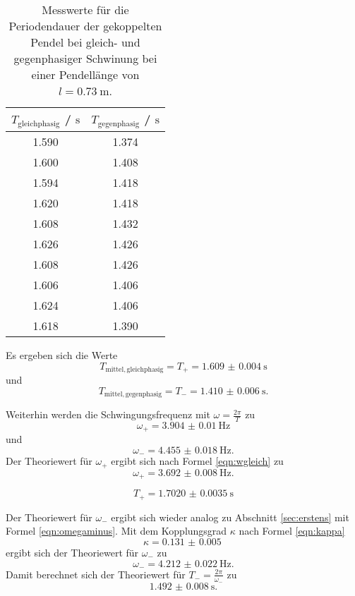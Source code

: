 
\begin{table}
	\centering
	\caption{Messwerte für die Periodendauer der gekoppelten Pendel bei gleich- und
	gegenphasiger Schwinung bei einer Pendellänge von $l=\SI{0.73}{\meter}$.}
	\label{tab:beckham}
	\begin{tabular}{cc}
		\toprule
		$T_{\mathrm{gleichphasig}}$ / $\si{\second}$ & $T_{\mathrm{gegenphasig}}$ 
		/ $\si{\second}$ \\
		\midrule
		1.590 & 1.374 \\
		1.600 & 1.408 \\
		1.594 & 1.418 \\
		1.620 & 1.418 \\
		1.608 & 1.432 \\
		1.626 & 1.426 \\
		1.608 & 1.426 \\
		1.606 & 1.406 \\
		1.624 & 1.406 \\
		1.618 & 1.390 \\
		\bottomrule
	\end{tabular}
\end{table}

Es ergeben sich die Werte 
\begin{equation*}
	T_{\mathrm{mittel,gleichphasig}} = T_+ = \SI{1.609(4)}{\second}
\end{equation*}
und
\begin{equation*}
	T_{\mathrm{mittel,gegenphasig}} = T_- = \SI{1.410(6)}{\second} \mathrm{.}
\end{equation*}

Weiterhin werden die Schwingungsfrequenz mit $\omega = \frac{2\pi}{T}$ zu
\begin{equation*}
	\omega_+ = \SI{3.904(10)}{\hertz}
\end{equation*}
und
\begin{equation*}
	\omega_- = \SI{4.455(18)}{\hertz} \mathrm{.}
\end{equation*}
Der Theoriewert für $\omega_+$ ergibt sich nach Formel \eqref{eqn:wgleich} zu
\begin{equation*}
	\omega_+ = \SI{3.692(8)}{\hertz} \mathrm{.}
\end{equation*}

\begin{equation*}
	T_+ = \SI{1.7020(35)}{\second} 
\end{equation*}

Der Theoriewert für $\omega_-$ ergibt sich wieder analog zu Abschnitt \ref{sec:erstens} mit 
Formel \eqref{eqn:omegaminus}. Mit dem Kopplungsgrad $\kappa$ nach Formel \eqref{eqn:kappa}
\begin{equation*}
	\kappa = \SI{0.131(5)}{}
\end{equation*}
ergibt sich der Theoriewert für $\omega_-$ zu
\begin{equation*}
	\omega_- = \SI{4.212(22)}{\hertz} \mathrm{.}
\end{equation*}
Damit berechnet sich der Theoriewert für $T_- = \frac{2\pi}{\omega_-}$ zu
\begin{equation*}
	\SI{1.492(8)}{\second} \mathrm{.}
\end{equation*}

